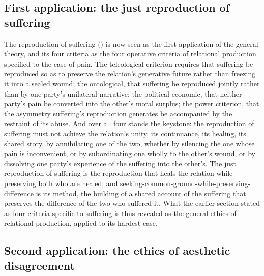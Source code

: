 \subsection{First application: the just reproduction of suffering}
\label{p21:sub:rp-suffering-application}

The reproduction of suffering () is now seen as the first application of the general theory, and its four criteria as the four operative criteria of relational production specified to the case of pain. The teleological criterion requires that suffering be reproduced so as to preserve the relation's generative future rather than freezing it into a sealed wound; the ontological, that suffering be reproduced jointly rather than by one party's unilateral narrative; the political-economic, that neither party's pain be converted into the other's moral surplus; the power criterion, that the asymmetry suffering's reproduction generates be accompanied by the restraint of its abuse. And over all four stands the keystone: the reproduction of suffering must not achieve the relation's unity, its continuance, its healing, its shared story, by annihilating one of the two, whether by silencing the one whose pain is inconvenient, or by subordinating one wholly to the other's wound, or by dissolving one party's experience of the suffering into the other's. The just reproduction of suffering is the reproduction that heals the relation while preserving both who are healed; and seeking-common-ground-while-preserving-difference is its method, the building of a shared account of the suffering that preserves the difference of the two who suffered it. What the earlier section stated as four criteria specific to suffering is thus revealed as the general ethics of relational production, applied to its hardest case.

\subsection{Second application: the ethics of aesthetic disagreement}
\label{p21:sub:rp-aesthetic-disagreement}

